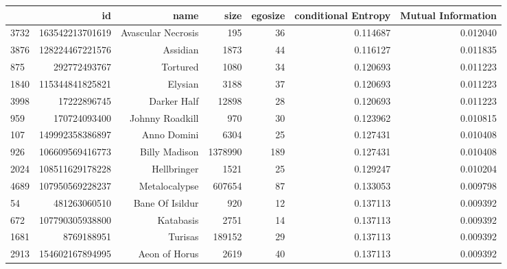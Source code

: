 \documentclass[letterpaper]{article}
\begin{document}
\begin{figure}
\cleardoublepage
\begin{table}
\begin{tabular}{| >{\small}l | >{\small}r | >{\small}r | >{\small}r | >{\small}r | >{\small}r |>{\small}r |}
\hline
{} &               id &                   name &     size &  egosize &  conditional Entropy &  Mutual Information \\
\hline
3732 &  163542213701619 &     Avascular Necrosis &      195 &       36 &             0.114687 &            0.012040 \\
3876 &  128224467221576 &               Assidian &     1873 &       44 &             0.116127 &            0.011835 \\
875  &     292772493767 &               Tortured &     1080 &       34 &             0.120693 &            0.011223 \\
1840 &  115344841825821 &                Elysian &     3188 &       37 &             0.120693 &            0.011223 \\
3998 &      17222896745 &            Darker Half &    12898 &       28 &             0.120693 &            0.011223 \\
959  &     170724093400 &        Johnny Roadkill &      970 &       30 &             0.123962 &            0.010815 \\
107  &  149992358386897 &            Anno Domini &     6304 &       25 &             0.127431 &            0.010408 \\
926  &  106609569416773 &          Billy Madison &  1378990 &      189 &             0.127431 &            0.010408 \\
2024 &  108511629178228 &            Hellbringer &     1521 &       25 &             0.129247 &            0.010204 \\
4689 &  107950569228237 &          Metalocalypse &   607654 &       87 &             0.133053 &            0.009798 \\
54   &     481263060510 &        Bane Of Isildur &      920 &       12 &             0.137113 &            0.009392 \\
672  &  107790305938800 &              Katabasis &     2751 &       14 &             0.137113 &            0.009392 \\
1681 &       8769188951 &                Turisas &   189152 &       29 &             0.137113 &            0.009392 \\
2913 &  154602167894995 &          Aeon of Horus &     2619 &       40 &             0.137113 &            0.009392 \\

\end{tabular}
\end{table}
\end{figure}
\end{document}

